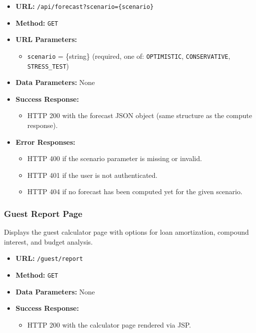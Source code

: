 \begin{itemize}
    \item \textbf{URL:} \texttt{/api/forecast?scenario=\{scenario\}}
    \item \textbf{Method:} \texttt{GET}
    \item \textbf{URL Parameters:}
    \begin{itemize}
        \item \texttt{scenario} = \{string\} (required, one of: \texttt{OPTIMISTIC}, \texttt{CONSERVATIVE}, \texttt{STRESS\_TEST})
    \end{itemize}
    \item \textbf{Data Parameters:} None
    \item \textbf{Success Response:}
    \begin{itemize}
        \item HTTP 200 with the forecast JSON object (same structure as the compute response).
    \end{itemize}
    \item \textbf{Error Responses:}
    \begin{itemize}
        \item HTTP 400 if the scenario parameter is missing or invalid.
        \item HTTP 401 if the user is not authenticated.
        \item HTTP 404 if no forecast has been computed yet for the given scenario.
    \end{itemize}
\end{itemize}


\subsubsection{Guest Report Page}

Displays the guest calculator page with options for loan amortization, compound interest, and budget analysis.

\begin{itemize}
    \item \textbf{URL:} \texttt{/guest/report}
    \item \textbf{Method:} \texttt{GET}
    \item \textbf{Data Parameters:} None
    \item \textbf{Success Response:}
    \begin{itemize}
        \item HTTP 200 with the calculator page rendered via JSP.
    \end{itemize}
\end{itemize}

